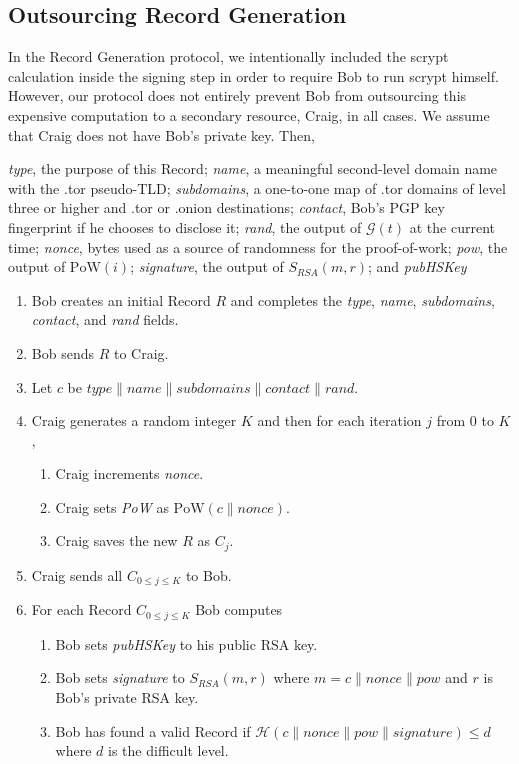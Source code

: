 \documentclass[conference]{IEEEtran}
\newcommand*\concat{\mathbin{\|}}
\begin{document}
\subsection{Outsourcing Record Generation}

In the Record Generation protocol, we intentionally included the scrypt calculation inside the signing step in order to require Bob to run scrypt himself. However, our protocol does not entirely prevent Bob from outsourcing this expensive computation to a secondary resource, Craig, in all cases. We assume that Craig does not have Bob's private key. Then,

\emph{type}, the purpose of this Record; \emph{name}, a meaningful second-level domain name with the .tor pseudo-TLD; \emph{subdomains}, a one-to-one map of .tor domains of level three or higher and .tor or .onion destinations; \emph{contact}, Bob's PGP key fingerprint if he chooses to disclose it; \emph{rand}, the output of $ \mathcal{G}(t) $ at the current time; \emph{nonce}, bytes used as a source of randomness for the proof-of-work; \emph{pow}, the output of $ \mathrm{PoW}(i) $; \emph{signature}, the output of $ S_{\mathit{RSA}}(m, r) $; and \emph{pubHSKey}

\begin{enumerate}
	\item Bob creates an initial Record $ R $ and completes the \emph{type}, \emph{name}, \emph{subdomains}, \emph{contact}, and \emph{rand} fields.
	\item Bob sends $ R $ to Craig.
	\item  Let $ \mathit{c} $ be $ \mathit{type} \concat \mathit{name} \concat \mathit{subdomains} \concat \mathit{contact} \concat \mathit{rand} $.
	\item Craig generates a random integer $ K $ and then for each iteration $ j $ from 0 to $ K $,
		\begin{enumerate}
			\item Craig increments \emph{nonce}.
			\item Craig sets \emph{PoW} as $ \mathrm{PoW}(\mathit{c} \concat \mathit{nonce}) $.
			\item Craig saves the new $ R $ as $ C_{j} $.
		\end{enumerate}
	\item Craig sends all $ C_{0 \le j \le K} $ to Bob.
	\item For each Record $ C_{0 \le j \le K} $ Bob computes
		\begin{enumerate}
			\item Bob sets \emph{pubHSKey} to his public RSA key.
			\item Bob sets \emph{signature} to $ S_{\mathit{RSA}}(m, r) $ where $ m = \mathit{c} \concat \mathit{nonce} \concat \mathit{pow} $ and $ r $ is Bob's private RSA key.
			\item Bob has found a valid Record if $ \mathcal{H}(\mathit{c} \concat \mathit{nonce} \concat \mathit{pow} \concat \mathit{signature}) \leq d $ where $ d $ is the difficult level.
		\end{enumerate}
\end{enumerate}
\end{document}
